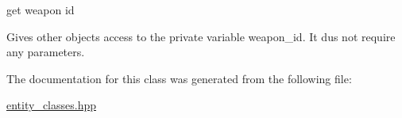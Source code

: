 get weapon id 

Gives other objects access to the private variable weapon\+\_\+id. It dus not require any parameters. 

The documentation for this class was generated from the following file\+:\begin{DoxyCompactItemize}
\item 
\hyperlink{entity__classes_8hpp}{entity\+\_\+classes.\+hpp}\end{DoxyCompactItemize}
